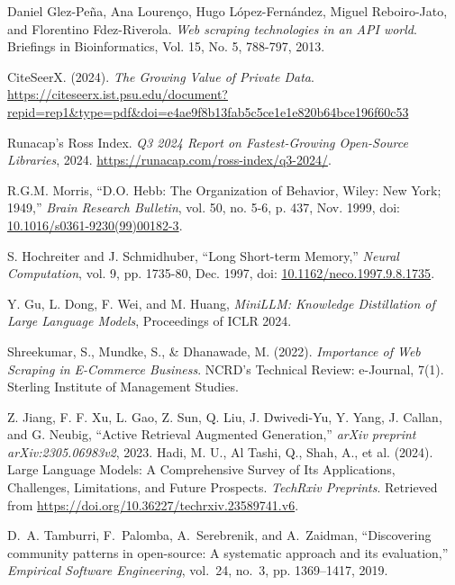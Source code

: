 \documentclass[english,master]{unibg}
\begin{document}
\begin{thebibliography}{1}
Daniel Glez-Peña, Ana Lourenço, Hugo López-Fernández, Miguel Reboiro-Jato, and Florentino Fdez-Riverola. 
\textit{Web scraping technologies in an API world}. Briefings in Bioinformatics, Vol. 15, No. 5, 788-797, 2013.

CiteSeerX. (2024). \textit{The Growing Value of Private Data}. \url{https://citeseerx.ist.psu.edu/document?repid=rep1&type=pdf&doi=e4ae9f8b13fab5c5ce1e1e820b64bce196f60c53}

Runacap's Ross Index. \emph{Q3 2024 Report on Fastest-Growing Open-Source Libraries}, 2024. \url{https://runacap.com/ross-index/q3-2024/}.


R.G.M. Morris, ``D.O. Hebb: The Organization of Behavior, Wiley: New York; 1949,'' \textit{Brain Research Bulletin}, vol. 50, no. 5-6, p. 437, Nov. 1999, doi: \href{https://doi.org/10.1016/s0361-9230(99)00182-3}{10.1016/s0361-9230(99)00182-3}.

S. Hochreiter and J. Schmidhuber, ``Long Short-term Memory,'' \textit{Neural Computation}, vol. 9, pp. 1735-80, Dec. 1997, doi: \href{https://doi.org/10.1162/neco.1997.9.8.1735}{10.1162/neco.1997.9.8.1735}.

Y. Gu, L. Dong, F. Wei, and M. Huang, 
\textit{MiniLLM: Knowledge Distillation of Large Language Models}, 
Proceedings of ICLR 2024.
    
Shreekumar, S., Mundke, S., \& Dhanawade, M. (2022). \textit{Importance of Web Scraping in E-Commerce Business}. NCRD’s Technical Review: e-Journal, 7(1). Sterling Institute of Management Studies.

    Z. Jiang, F. F. Xu, L. Gao, Z. Sun, Q. Liu, J. Dwivedi-Yu, Y. Yang, J. Callan, and G. Neubig, ``Active Retrieval Augmented Generation,'' \emph{arXiv preprint arXiv:2305.06983v2}, 2023.
Hadi, M. U., Al Tashi, Q., Shah, A., et al. (2024). Large Language Models: A Comprehensive Survey of Its Applications, Challenges, Limitations, and Future Prospects. \textit{TechRxiv Preprints}. Retrieved from \url{https://doi.org/10.36227/techrxiv.23589741.v6}.


D.~A. Tamburri, F.~Palomba, A.~Serebrenik, and A.~Zaidman, ``Discovering community patterns in open-source: A systematic approach and its evaluation,'' \emph{Empirical Software Engineering}, vol.~24, no.~3, pp. 1369–1417, 2019.

\end{thebibliography}
\end{document}
